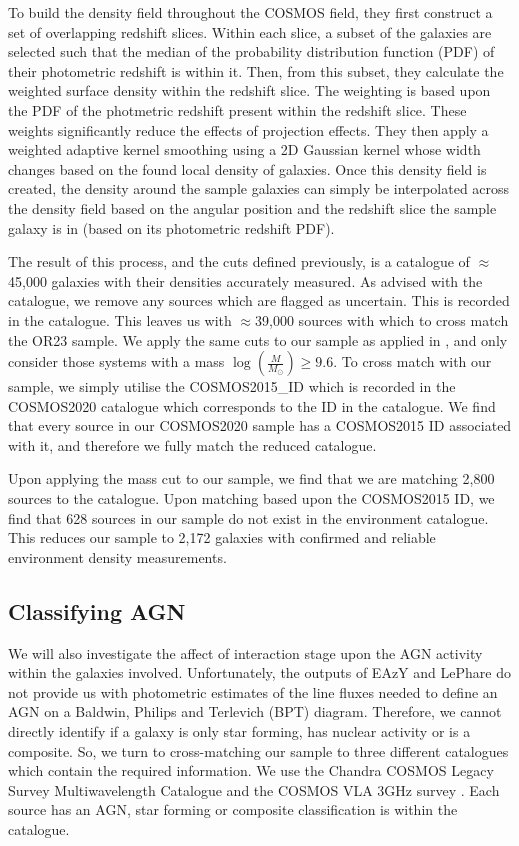 \documentclass[fleqn,usenatbib]{mnras}
\begin{document}
To build the density field throughout the COSMOS field, they first construct a set of overlapping redshift slices. Within each slice, a subset of the galaxies are selected such that the median of the probability distribution function (PDF) of their photometric redshift is within it. Then, from this subset, they calculate the weighted surface density within the redshift slice. The weighting is based upon the PDF of the photmetric redshift present within the redshift slice. These weights significantly reduce the effects of projection effects. They then apply a weighted adaptive kernel smoothing using a 2D Gaussian kernel whose width changes based on the found local density of galaxies. Once this density field is created, the density around the sample galaxies can simply be interpolated across the density field based on the angular position and the redshift slice the sample galaxy is in (based on its photometric redshift PDF).

The result of this process, and the cuts defined previously, is a catalogue of $\approx$45,000 galaxies with their densities accurately measured. As advised with the catalogue, we remove any sources which are flagged as uncertain. This is recorded in the catalogue. This leaves us with $\approx$39,000 sources with which to cross match the OR23 sample. We apply the same cuts to our sample as applied in \citet{2017ApJ...837...16D}, and only consider those systems with a mass $\log(\frac{M}{M_\odot}) \geq 9.6$. To cross match with our sample, we simply utilise the COSMOS2015\_ID which is recorded in the COSMOS2020 catalogue which corresponds to the ID in the \citet{2017ApJ...837...16D} catalogue. We find that every source in our COSMOS2020 sample has a COSMOS2015 ID associated with it, and therefore we fully match the reduced catalogue.

Upon applying the mass cut to our sample, we find that we are matching 2,800 sources to the \citet{2017ApJ...837...16D} catalogue. Upon matching based upon the COSMOS2015 ID, we find that 628 sources in our sample do not exist in the environment catalogue. This reduces our sample to 2,172 galaxies with confirmed and reliable environment density measurements.

\subsection{Classifying AGN}\label{sec:agn-clsf}
\noindent We will also investigate the affect of interaction stage upon the AGN activity within the galaxies involved. Unfortunately, the outputs of EAzY and LePhare do not provide us with photometric estimates of the line fluxes needed to define an AGN on a Baldwin, Philips and Terlevich (BPT) diagram. Therefore, we cannot directly identify if a galaxy is only star forming, has nuclear activity or is a composite. So, we turn to cross-matching our sample to three different catalogues which contain the required information. We use the Chandra COSMOS Legacy Survey Multiwavelength Catalogue \citep{2016ApJ...817...34M} and the COSMOS VLA 3GHz survey \citep{2017A&A...602A...6S, 2017A&A...602A...3D}. Each source has an AGN, star forming or composite classification is within the catalogue.
\end{document}
